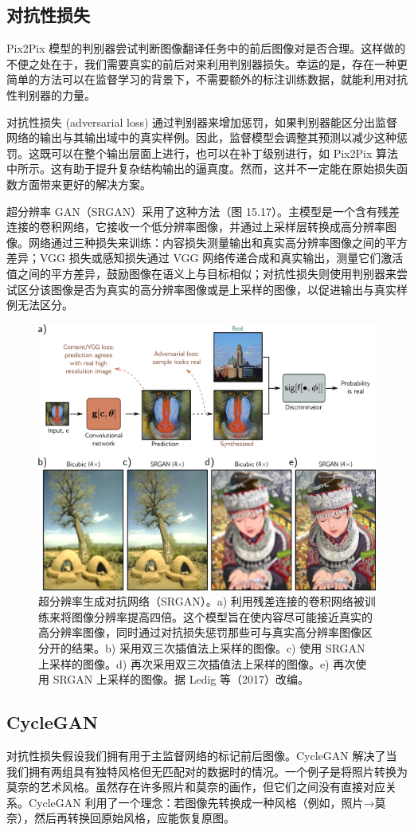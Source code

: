 \subsection{对抗性损失}
Pix2Pix 模型的判别器尝试判断图像翻译任务中的前后图像对是否合理。这样做的不便之处在于，我们需要真实的前后对来利用判别器损失。幸运的是，存在一种更简单的方法可以在监督学习的背景下，不需要额外的标注训练数据，就能利用对抗性判别器的力量。

对抗性损失 (adversarial loss) 通过判别器来增加惩罚，如果判别器能区分出监督网络的输出与其输出域中的真实样例。因此，监督模型会调整其预测以减少这种惩罚。这既可以在整个输出层面上进行，也可以在补丁级别进行，如 Pix2Pix 算法中所示。这有助于提升复杂结构输出的逼真度。然而，这并不一定能在原始损失函数方面带来更好的解决方案。

超分辨率 GAN（SRGAN）采用了这种方法（图 15.17）。主模型是一个含有残差连接的卷积网络，它接收一个低分辨率图像，并通过上采样层转换成高分辨率图像。网络通过三种损失来训练：内容损失测量输出和真实高分辨率图像之间的平方差异；VGG 损失或感知损失通过 VGG 网络传递合成和真实输出，测量它们激活值之间的平方差异，鼓励图像在语义上与目标相似；对抗性损失则使用判别器来尝试区分该图像是否为真实的高分辨率图像或是上采样的图像，以促进输出与真实样例无法区分。

\begin{figure}[ht!]
\centering
\includegraphics[width=0.7\linewidth]{png/chapter15/GanSuperRes.png}
\caption{超分辨率生成对抗网络（SRGAN）。a) 利用残差连接的卷积网络被训练来将图像分辨率提高四倍。这个模型旨在使内容尽可能接近真实的高分辨率图像，同时通过对抗损失惩罚那些可与真实高分辨率图像区分开的结果。b) 采用双三次插值法上采样的图像。c) 使用 SRGAN 上采样的图像。d) 再次采用双三次插值法上采样的图像。e) 再次使用 SRGAN 上采样的图像。据 Ledig 等（2017）改编。}
\end{figure}


\subsection{CycleGAN}
对抗性损失假设我们拥有用于主监督网络的标记前后图像。CycleGAN 解决了当我们拥有两组具有独特风格但无匹配对的数据时的情况。一个例子是将照片转换为莫奈的艺术风格。虽然存在许多照片和莫奈的画作，但它们之间没有直接对应关系。CycleGAN 利用了一个理念：若图像先转换成一种风格（例如，照片→莫奈），然后再转换回原始风格，应能恢复原图。

